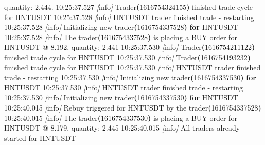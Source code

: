 \documentclass[
  oneside]{book}
\newenvironment{Shaded}{\begin{snugshade}}{\end{snugshade}}
\newcommand{\AttributeTok}[1]{\textcolor[rgb]{0.13,0.29,0.53}{#1}}
\newcommand{\ControlFlowTok}[1]{\textcolor[rgb]{0.13,0.29,0.53}{\textbf{#1}}}
\newcommand{\ErrorTok}[1]{\textcolor[rgb]{0.64,0.00,0.00}{\textbf{#1}}}
\newcommand{\ExtensionTok}[1]{#1}
\newcommand{\KeywordTok}[1]{\textcolor[rgb]{0.13,0.29,0.53}{\textbf{#1}}}
\newcommand{\NormalTok}[1]{#1}
\newcommand{\PreprocessorTok}[1]{\textcolor[rgb]{0.56,0.35,0.01}{\textit{#1}}}
\newcommand{\SpecialStringTok}[1]{\textcolor[rgb]{0.31,0.60,0.02}{#1}}
\begin{document}
\begin{Shaded}
\begin{Highlighting}[]
\ExtensionTok{quantity:}\NormalTok{ 2.444.}
\ExtensionTok{10:25:37.527} \PreprocessorTok{[}\SpecialStringTok{info}\PreprocessorTok{]}\NormalTok{  Trader}\ErrorTok{(}\ExtensionTok{1616754324155}\KeywordTok{)} \ExtensionTok{finished}\NormalTok{ trade cycle for HNTUSDT}
\ExtensionTok{10:25:37.528} \PreprocessorTok{[}\SpecialStringTok{info}\PreprocessorTok{]}\NormalTok{  HNTUSDT trader finished trade }\AttributeTok{{-}}\NormalTok{ restarting}
\ExtensionTok{10:25:37.528} \PreprocessorTok{[}\SpecialStringTok{info}\PreprocessorTok{]}\NormalTok{  Initializing new trader}\ErrorTok{(}\ExtensionTok{1616754337528}\KeywordTok{)} \ControlFlowTok{for}\NormalTok{ HNTUSDT}
\ExtensionTok{10:25:37.528} \PreprocessorTok{[}\SpecialStringTok{info}\PreprocessorTok{]}\NormalTok{  The trader}\ErrorTok{(}\ExtensionTok{1616754337528}\KeywordTok{)} \ExtensionTok{is}\NormalTok{ placing a BUY order for HNTUSDT @ 8.192,}
\ExtensionTok{quantity:}\NormalTok{ 2.441}
\ExtensionTok{10:25:37.530} \PreprocessorTok{[}\SpecialStringTok{info}\PreprocessorTok{]}\NormalTok{  Trader}\ErrorTok{(}\ExtensionTok{1616754211122}\KeywordTok{)} \ExtensionTok{finished}\NormalTok{ trade cycle for HNTUSDT}
\ExtensionTok{10:25:37.530} \PreprocessorTok{[}\SpecialStringTok{info}\PreprocessorTok{]}\NormalTok{  Trader}\ErrorTok{(}\ExtensionTok{1616754193232}\KeywordTok{)} \ExtensionTok{finished}\NormalTok{ trade cycle for HNTUSDT}
\ExtensionTok{10:25:37.530} \PreprocessorTok{[}\SpecialStringTok{info}\PreprocessorTok{]}\NormalTok{  HNTUSDT trader finished trade }\AttributeTok{{-}}\NormalTok{ restarting}
\ExtensionTok{10:25:37.530} \PreprocessorTok{[}\SpecialStringTok{info}\PreprocessorTok{]}\NormalTok{  Initializing new trader}\ErrorTok{(}\ExtensionTok{1616754337530}\KeywordTok{)} \ControlFlowTok{for}\NormalTok{ HNTUSDT}
\ExtensionTok{10:25:37.530} \PreprocessorTok{[}\SpecialStringTok{info}\PreprocessorTok{]}\NormalTok{  HNTUSDT trader finished trade }\AttributeTok{{-}}\NormalTok{ restarting}
\ExtensionTok{10:25:37.530} \PreprocessorTok{[}\SpecialStringTok{info}\PreprocessorTok{]}\NormalTok{  Initializing new trader}\ErrorTok{(}\ExtensionTok{1616754337530}\KeywordTok{)} \ControlFlowTok{for}\NormalTok{ HNTUSDT}
\ExtensionTok{10:25:40.015} \PreprocessorTok{[}\SpecialStringTok{info}\PreprocessorTok{]}\NormalTok{  Rebuy triggered for HNTUSDT by the trader}\ErrorTok{(}\ExtensionTok{1616754337528}\KeywordTok{)}
\ExtensionTok{10:25:40.015} \PreprocessorTok{[}\SpecialStringTok{info}\PreprocessorTok{]}\NormalTok{  The trader}\ErrorTok{(}\ExtensionTok{1616754337530}\KeywordTok{)} \ExtensionTok{is}\NormalTok{ placing a BUY order for HNTUSDT @ 8.179,}
\ExtensionTok{quantity:}\NormalTok{ 2.445}
\ExtensionTok{10:25:40.015} \PreprocessorTok{[}\SpecialStringTok{info}\PreprocessorTok{]}\NormalTok{  All traders already started for HNTUSDT}
\end{Highlighting}
\end{Shaded}
\end{document}
